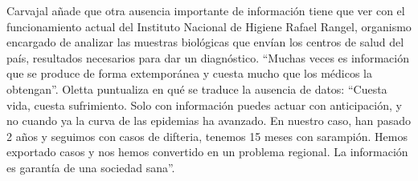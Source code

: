 \documentclass{article}%
\begin{document}
\newline%
%
Carvajal añade que otra ausencia importante de información tiene que ver con el funcionamiento actual del Instituto Nacional de Higiene Rafael Rangel, organismo encargado de analizar las muestras biológicas que envían los centros de salud del país, resultados necesarios para dar un diagnóstico. “Muchas veces es información que se produce de forma extemporánea y cuesta mucho que los médicos la obtengan”.%
\newline%
%
Oletta puntualiza en qué se traduce la ausencia de datos: “Cuesta vida, cuesta sufrimiento. Solo con información puedes actuar con anticipación, y no cuando ya la curva de las epidemias ha avanzado. En nuestro caso, han pasado 2 años y seguimos con casos de difteria, tenemos 15 meses con sarampión. Hemos exportado casos y nos hemos convertido en un problema regional. La información es garantía de una sociedad sana”.%
\newline%
%
\end{document}

